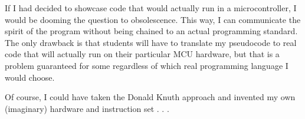 If I had decided to showcase code that would actually run in a microcontroller, I would be dooming the question to obsolescence.  This way, I can communicate the spirit of the program without being chained to an actual programming standard.  The only drawback is that students will have to translate my pseudocode to real code that will actually run on their particular MCU hardware, but that is a problem guaranteed for some regardless of which real programming language I would choose.

Of course, I could have taken the Donald Knuth approach and invented my own (imaginary) hardware and instruction set . . . 





